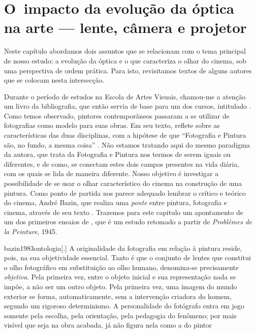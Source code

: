 
\chapter{O~impacto da evolução da óptica na arte --- lente, câmera e projetor}%
\label{cap2-impacto-evolucao-otica}

Neste capítulo abordamos dois assuntos que se relacionam com o tema
principal de nosso estudo: a evolução da óptica e o que caracteriza o
olhar do cinema, sob uma perspectiva de ordem prática. Para isto,
revisitamos textos de alguns autores que se colocam nesta intersecção.

Durante o período de estudos na Escola de Artes Visuais, chamou-me a
atenção um livro da bibliografia, que então servia de base para um dos
cursos, intitulado . Como
temos observado, pintores contemporâneos passaram a se utilizar de
fotografias como modelo para suas obras. Em seu texto, \textcite{flores2011fotografia}
reflete sobre as características das duas disciplinas, com a hipótese de que
\enquote{Fotografia e Pintura são, no fundo, a mesma coisa}
\parencite[7]{flores2011fotografia}. Não estamos tratando aqui do mesmo
paradigma da autora, que trata da Fotografia e Pintura nos termos de
serem iguais ou diferentes, e de como, se conectam estes dois campos
presentes na vida diária, com os quais se lida de maneira diferente.
Nosso objetivo é investigar a possibilidade de se usar o olhar
característico do cinema na construção de uma pintura. Como ponto de
partida nos parece adequado lembrar o crítico e teórico do cinema,
André Bazin, que realiza uma \emph{ponte} entre pintura, fotografia e
cinema, através de seu texto .
Trazemos para este capitulo um apontamento de um dos primeiros ensaios
de \textcite{bazin1983ontologia}, que é um estudo retomado a partir de
\emph{Problèmes de la Peinture}, 1945.

\begin{displaycquote}[125]{bazin1983ontologia}[.]
	A originalidade da fotografia em relação à pintura reside, pois, na sua
	objetividade essencial. Tanto é que o conjunto de lentes que constitui o
	olho fotográfico em substituição ao olho humano, denomina-se
	precisamente \emph{objetiva}. Pela primeira vez, entre o objeto inicial
	e sua representação nada se impõe, a não ser um outro objeto. Pela
	primeira vez, uma imagem do mundo exterior se forma, automaticamente,
	sem a intervenção criadora do homem, segundo um rigoroso determinismo. A
	personalidade do fotógrafo entra em jogo somente pela escolha, pela
	orientação, pela pedagogia do fenômeno; por mais visível que seja na
	obra acabada, já não figura nela como a do pintor
\end{displaycquote}

